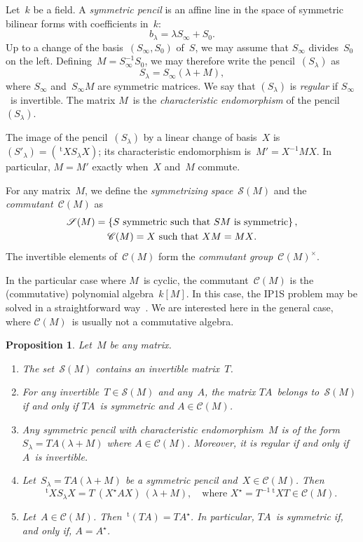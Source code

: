 \documentclass{article}%
\newtheorem{prop}{Proposition}
\let\ro\mathscr
\def\transpose{\,{}^{\mathrm{t}\!}}
\def\acco#1{\left\{#1\right\}}
\begin{document}
Let~$k$ be a field. A \emph{symmetric pencil} is an affine line in the
space of symmetric bilinear forms with coefficients in~$k$:
\begin{equation}
b_{λ} = λ S_{∞} + S_0.
\end{equation}
Up to a change of the basis~$(S_{∞}, S_{0})$ of~$S$, we may assume that
$S_{∞}$ divides~$S_0$ on the left. Defining~$M = S_{∞}^{-1} S_0^{}$, we
may therefore write the pencil~$(S_{λ})$ as
\begin{equation}
S_{λ} = S_{∞} (λ + M),
\end{equation}
where $S_{∞}$ and~$S_{∞} M$ are symmetric matrices. We say that $(S_{λ})$
is \emph{regular} if $S_{∞}$~is invertible. The matrix $M$~is the
\emph{characteristic endomorphism} of the pencil~$(S_{λ})$.

The image of the pencil~$(S_{λ})$ by a linear change of basis~$X$
is~$(S'_{λ}) = (\transpose{X} S_{λ} X)$; its characteristic endomorphism
is~$M' = X^{-1} M X$. In particular, $M = M'$ exactly when~$X$ and~$M$
commute.


For any matrix~$M$, we define the \emph{symmetrizing space}~$\ro S(M)$
and the \emph{commutant}~$\ro C(M)$ as
\begin{gather}
\ro S(M) = \acco{\text{$S$ symmetric such that $SM$~is symmetric} },\\
\ro C(M) = \text{\text{$X$ such that~$XM = MX$}}.
\end{gather}
The invertible elements of~$\ro C(M)$ form the \emph{commutant
group}~$\ro C(M)^{×}$.

In the particular case where $M$~is cyclic, the commutant~$\ro C(M)$ is
the (commutative) polynomial algebra~$k[M]$. In this case, the IP1S
problem may be solved in a straightforward way~\cite{MPG2013}. We are
interested here in the general case, where $\ro C(M)$~is usually not a
commutative algebra.

\begin{prop}\label{prop:structure-sym}
Let~$M$ be any matrix.
\begin{enumerate}
\item \label{it:sym-inv} The set~$\ro S(M)$ contains an invertible
matrix~$T$.
\item \label{it:sym-comm} For any invertible~$T ∈ \ro S(M)$ and any~$A$,
the matrix $TA$~belongs to~$\ro S(M)$ if and only if $TA$~is symmetric
and $A ∈ \ro C(M)$.
\item Any symmetric pencil with characteristic endomorphism~$M$ is of the
form~$S_{λ} = TA (λ + M)$ where $A ∈ \ro C(M)$. Moreover, it is regular
if and only if $A$~is invertible.
\item Let~$S_{λ} = TA (λ + M)$ be a symmetric pencil and~$X ∈ \ro C(M)$.
Then
\begin{equation*}
\transpose{X} S_{λ} X = T \:(X^{⋆} A X)\: (λ + M), \quad
\text{where $X^{⋆} = T^{-1} \transpose{X} T ∈ \ro C(M)$.}
\end{equation*}
\item Let~$A ∈ \ro C(M)$. Then $\transpose{(TA)} = TA^{⋆}$. In
particular, $TA$~is symmetric if, and only if, $A = A^{⋆}$.
\end{enumerate}
\end{prop}
\end{document}
